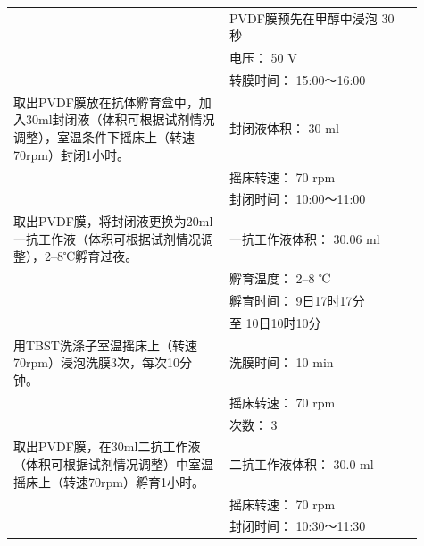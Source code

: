 \documentclass[UTF8,10pt,a4paper,fontset=fandol]{ctexart}
\newcommand{\fieldvalue}[1]{#1}
\newcommand{\handwritten}[1]{#1}
\begin{document}
\begin{tabular}{|p{0.48\linewidth}|p{0.43\linewidth}|}
&
PVDF膜预先在甲醇中浸泡
\fieldvalue{\handwritten{30}} 秒\\
&
电压：
\fieldvalue{\handwritten{50}} V\\
&
转膜时间：
\fieldvalue{\handwritten{15:00～16:00}}
\\
\hline
取出PVDF膜放在抗体孵育盒中，加入30ml封闭液（体积可根据试剂情况调整），室温条件下摇床上（转速70rpm）封闭1小时。
&
封闭液体积：
\fieldvalue{\handwritten{30}} ml\\
&
摇床转速：
\fieldvalue{\handwritten{70}} rpm\\
&
封闭时间：
\fieldvalue{\handwritten{10:00～11:00}}
\\
\hline
取出PVDF膜，将封闭液更换为20ml一抗工作液（体积可根据试剂情况调整），2--8℃孵育过夜。
&
一抗工作液体积：
\fieldvalue{\handwritten{30.06}} ml\\
&
孵育温度：
\fieldvalue{\handwritten{2--8}} ℃\\
&
孵育时间：
\fieldvalue{\handwritten{9日17时17分}}\\
&
至
\fieldvalue{\handwritten{10日10时10分}}
\\
\hline
用TBST洗涤子室温摇床上（转速70rpm）浸泡洗膜3次，每次10分钟。
&
洗膜时间：
\fieldvalue{\handwritten{10}} min\\
&
摇床转速：
\fieldvalue{\handwritten{70}} rpm\\
&
次数：
\fieldvalue{\handwritten{3}}
\\
\hline
取出PVDF膜，在30ml二抗工作液（体积可根据试剂情况调整）中室温摇床上（转速70rpm）孵育1小时。
&
二抗工作液体积：
\fieldvalue{\handwritten{30.0}} ml\\
&
摇床转速：
\fieldvalue{\handwritten{70}} rpm\\
&
封闭时间：
\fieldvalue{\handwritten{10:30～11:30}}
\\
\hline
\end{tabular}
\end{document}
